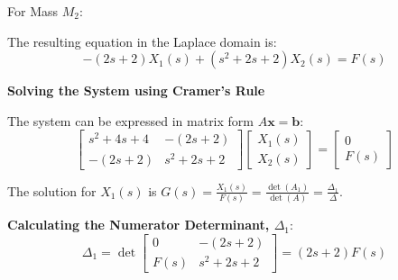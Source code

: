 ﻿\documentclass[11pt]{article}
\begin{document}
\vspace{12pt}
{For Mass $M_2$:}
\begin{figure}[h!]
\centering
{}
\end{figure}

The resulting equation in the Laplace domain is:
\begin{equation}
-(2s + 2)X_1(s) + (s^2 + 2s + 2)X_2(s) = F(s) \tag{2}
\end{equation}

\newpage
\noindent\textbf{Solving the System using Cramer's Rule}
\vspace{12pt}

The system can be expressed in matrix form $A\mathbf{x} = \mathbf{b}$:
$$
\begin{bmatrix}
s^2 + 4s + 4 & -(2s + 2) \\
-(2s + 2) & s^2 + 2s + 2
\end{bmatrix}
\begin{bmatrix}
X_1(s) \\
X_2(s)
\end{bmatrix}
=
\begin{bmatrix}
0 \\
F(s)
\end{bmatrix}
$$

The solution for $X_1(s)$ is $G(s) = \frac{X_1(s)}{F(s)} = \frac{\det(A_1)}{\det(A)} = \frac{\Delta_1}{\Delta}$.

\vspace{12pt}
\noindent\textbf{Calculating the Numerator Determinant, $\Delta_1$}:
$$ \Delta_1 = \det
\begin{bmatrix}
0 & -(2s + 2) \\
F(s) & s^2 + 2s + 2
\end{bmatrix}
= (2s + 2)F(s) $$
\end{document}
